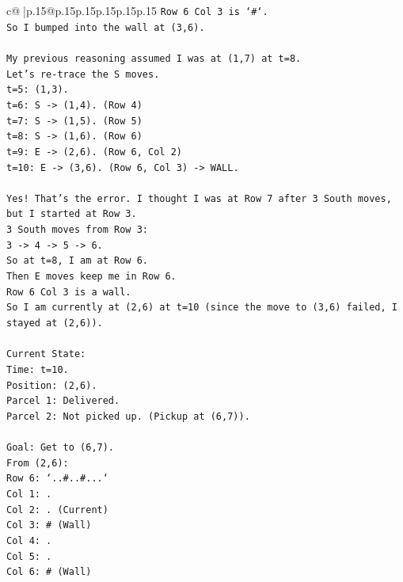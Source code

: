 \documentclass{article}
\begin{document}
{\begin{supertabular}{c@{$\;$}|p{.15\linewidth}@{}p{.15\linewidth}p{.15\linewidth}p{.15\linewidth}p{.15\linewidth}p{.15\linewidth}}
{{{\texttt{Row 6 Col 3 is `\#`.} \\
\texttt{So I bumped into the wall at (3,6).} \\
\\ 
\texttt{My previous reasoning assumed I was at (1,7) at t=8.} \\
\texttt{Let's re{-}trace the S moves.} \\
\texttt{t=5: (1,3).} \\
\texttt{t=6: S {-}> (1,4). (Row 4)} \\
\texttt{t=7: S {-}> (1,5). (Row 5)} \\
\texttt{t=8: S {-}> (1,6). (Row 6)} \\
\texttt{t=9: E {-}> (2,6). (Row 6, Col 2)} \\
\texttt{t=10: E {-}> (3,6). (Row 6, Col 3) {-}> WALL.} \\
\\ 
\texttt{Yes! That's the error. I thought I was at Row 7 after 3 South moves, but I started at Row 3.} \\
\texttt{3 South moves from Row 3:} \\
\texttt{3 {-}> 4 {-}> 5 {-}> 6.} \\
\texttt{So at t=8, I am at Row 6.} \\
\texttt{Then E moves keep me in Row 6.} \\
\texttt{Row 6 Col 3 is a wall.} \\
\texttt{So I am currently at (2,6) at t=10 (since the move to (3,6) failed, I stayed at (2,6)).} \\
\\ 
\texttt{Current State:} \\
\texttt{Time: t=10.} \\
\texttt{Position: (2,6).} \\
\texttt{Parcel 1: Delivered.} \\
\texttt{Parcel 2: Not picked up. (Pickup at (6,7)).} \\
\\ 
\texttt{Goal: Get to (6,7).} \\
\texttt{From (2,6):} \\
\texttt{Row 6: `..\#..\#...`} \\
\texttt{Col 1: .} \\
\texttt{Col 2: . (Current)} \\
\texttt{Col 3: \# (Wall)} \\
\texttt{Col 4: .} \\
\texttt{Col 5: .} \\
\texttt{Col 6: \# (Wall)} \\
}}}
\end{supertabular}}
\end{document}
